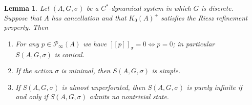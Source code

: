 \documentclass[a4paper, 12pt]{amsart}
\numberwithin{equation}{section}
\newcounter{theorem}
\newtheorem{lemma}[theorem]{Lemma}
\theoremstyle{remark}
\theoremstyle{definition}
\begin{document}
\begin{lemma}\label{lem.A.conical}
Let $(A,G,\sigma)$ be a $C^*$-dynamical system in which $G$ is discrete. Suppose that $A$
has cancellation and that $K_0(A)^+$ satisfies the Riesz refinement property. Then
\begin{enumerate}
\item\label{lem.A.conical.i} For any $p\in {\mathcal{P}}_\infty(A)$ we have $[[p]]_\sigma=0 \Leftrightarrow p=0$; in particular $S(A,G,\sigma)$ is conical.
\item\label{lem.A.conical.ii} If the action $\sigma$ is minimal, then $S(A,G,\sigma)$ is simple.
\item\label{lem.A.conical.iii} If $S(A,G,\sigma)$ is almost unperforated, then $S(A,G,\sigma)$ is
    purely infinite if and only if $S(A,G,\sigma)$ admits no nontrivial state.
\end{enumerate}
\end{lemma}
\end{document}
